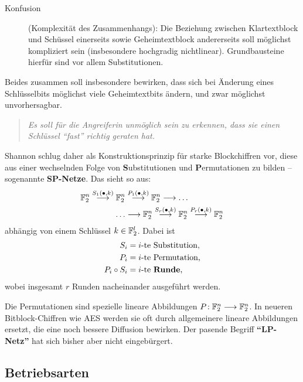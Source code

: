 \begin{refsegment}
\begin{description}
\item[Konfusion] (Komplexität des Zusammenhangs): Die Beziehung
    zwischen Klartextblock und Schüssel einerseits sowie Geheimtextblock
    andererseits soll möglichst kompliziert sein
    (insbesondere hochgradig nichtlinear).
    Grundbausteine hierfür sind vor allem Substitutionen.
\end{description}
Beides zusammen soll insbesondere bewirken, dass sich bei Änderung
eines Schlüsselbits möglichst viele Geheimtextbits ändern, und zwar
möglichst unvorhersagbar.
\begin{quote}
   {\em Es soll für die Angreiferin unmöglich sein zu erkennen,
   dass sie einen Schlüssel "`fast"' richtig geraten hat.}
\end{quote}
Shannon schlug daher als Konstruktionsprinzip
für starke Blockchiffren vor,
diese aus einer wechselnden Folge von \textbf{S}ubstitutionen und
\textbf{P}ermutationen zu bilden -- sogenannte \textbf{SP-Netze}.
Das sieht so aus:
\begin{align*}
    \mathbb{F}_2^n \stackrel{S_1(\bullet,k)}{\longrightarrow} \mathbb{F}_2^n &
       \stackrel{P_1(\bullet,k)}{\longrightarrow}
       \mathbb{F}_2^n \longrightarrow \ldots \\
    \ldots &\longrightarrow
       \mathbb{F}_2^n \stackrel{S_r(\bullet,k)}{\longrightarrow}
       \mathbb{F}_2^n \stackrel{P_r(\bullet,k)}{\longrightarrow} \mathbb{F}_2^n
\end{align*}
abhängig von einem Schlüssel $k \in \mathbb{F}_2^l$. Dabei ist
\begin{align*}
    S_i & = \text{$i$-te Substitution,} \\
    P_i & = \text{$i$-te Permutation,} \\
    P_i \circ S_i & = \text{$i$-te \textbf{Runde},}
\end{align*}
wobei insgesamt $r$ Runden nacheinander ausgeführt werden.

Die Permutationen sind spezielle lineare
Abbildungen
$P\!: \mathbb{F}_2^n \longrightarrow \mathbb{F}_2^n$. In neueren Bitblock-Chiffren
wie AES werden sie oft durch allgemeinere lineare
Abbildungen ersetzt, die eine noch bessere Diffusion bewirken.
Der pasende Begriff \textbf{"`LP-Netz"'} hat sich
bisher aber nicht eingebürgert.

\subsection{Betriebsarten}\label{ss-bool-modi}


\end{refsegment}
